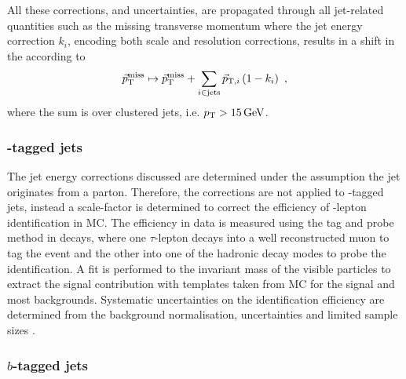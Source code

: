 All these corrections, and uncertainties, are propagated through all
jet-related quantities such as the missing transverse momentum where the jet
energy correction $k_i$, encoding both scale and resolution corrections,
results in a shift in the \ptmiss according to
%
\begin{equation}
    \vec{p}_{\text{T}}^{\mathrm{miss}} \mapsto \vec{p}_{\text{T}}^{\mathrm{miss}} + \sum_{i\in\mathrm{jets}}\vec{p}_{\mathrm{T},i} \left( 1 - k_i \right)\ ,
\end{equation}
%
where the sum is over clustered jets, i.e. ${p_{\text{T}}>\SI{15}{GeV}}$. 


\subsubsection{\Ptauh-tagged jets}

The jet energy corrections discussed are determined under the assumption the
jet originates from a parton. Therefore, the corrections are not applied to
\Ptauh-tagged jets, instead a scale-factor is determined to correct the
efficiency of \Ptauh-lepton identification in MC. The efficiency in data is
measured using the tag and probe method in \IDYtt decays, where one
$\tau$-lepton decays into a well reconstructed muon to tag the event and the
other into one of the hadronic decay modes to probe the identification. A fit
is performed to the invariant mass of the visible particles to extract the
signal contribution with templates taken from MC for the signal and most
backgrounds. Systematic uncertainties on the identification efficiency are
determined from the background normalisation, \ptmiss uncertainties and
limited sample sizes \cite{Sirunyan:2018pgf}.


\subsubsection{$b$-tagged jets}

